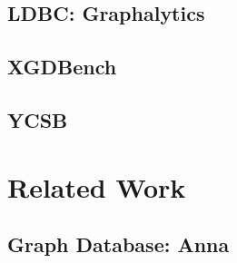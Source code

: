 \subsection{LDBC: Graphalytics}

\subsection{XGDBench}

\subsection{YCSB}

\section{Related Work}

\subsection{Graph Database: Anna}

\subsection{}
